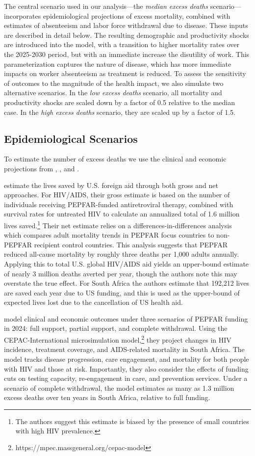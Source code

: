 \documentclass[letterpaper,12pt]{article}
\theoremstyle{definition}
\begin{document}
\begin{spacing}{1.5}
The central scenario used in our analysis—the \textit{median excess deaths} scenario—incorporates epidemiological projections of excess mortality, combined with estimates of absenteeism and labor force withdrawal due to disease. These inputs are described in detail below. The resulting demographic and productivity shocks are introduced into the model, with a transition to higher mortality rates over the 2025-2030 period, but with an immediate increase the disutility of work. This parameterization captures the nature of disease, which has more immediate impacts on worker absenteeism as treatment is reduced. To assess the sensitivity of outcomes to the magnitude of the health impact, we also simulate two alternative scenarios. In the \textit{low excess deaths} scenario, all mortality and productivity shocks are scaled down by a factor of 0.5 relative to the median case. In the \textit{high excess deaths} scenario, they are scaled up by a factor of 1.5.


\subsection{Epidemiological Scenarios}
To estimate the number of excess deaths we use the clinical and economic projections from \citet{KS2025}, \citet{Gandhi2025}, and \citet{Brink2025}.

\citet{KS2025} estimate the lives saved by U.S. foreign aid through both gross and net approaches. For HIV/AIDS, their gross estimate is based on the number of individuals receiving PEPFAR-funded antiretroviral therapy, combined with survival rates for untreated HIV to calculate an annualized total of 1.6 million lives saved.\footnote{The authors suggest this estimate is biased by the presence of small countries with high HIV prevalence.} Their net estimate relies on a differences-in-differences analysis which compares adult mortality trends in PEPFAR focus countries to non-PEPFAR recipient control countries. This analysis suggests that PEPFAR reduced all-cause mortality by roughly three deaths per 1,000 adults annually. Applying this to total U.S. global HIV/AIDS aid yields an upper-bound estimate of nearly 3 million deaths averted per year, though the authors note this may overstate the true effect. For South Africa the authors estimate that 192,212 lives are saved each year due to US funding, and this is used as the upper-bound of expected lives lost due to the cancellation of US health aid.

\citet{Gandhi2025} model clinical and economic outcomes under three scenarios of PEPFAR funding in 2024: full support, partial support, and complete withdrawal. Using the CEPAC-International microsimulation model,\footnote{https://mpec.massgeneral.org/cepac-model} they project changes in HIV incidence, treatment coverage, and AIDS-related mortality in South Africa. The model tracks disease progression, care engagement, and mortality for both people with HIV and those at risk. Importantly, they also consider the effects of funding cuts on testing capacity, re-engagement in care, and prevention services. Under a scenario of complete withdrawal, the model estimates as many as 1.3 million excess deaths over ten years in South Africa, relative to full funding.


\end{spacing}
\end{document}
